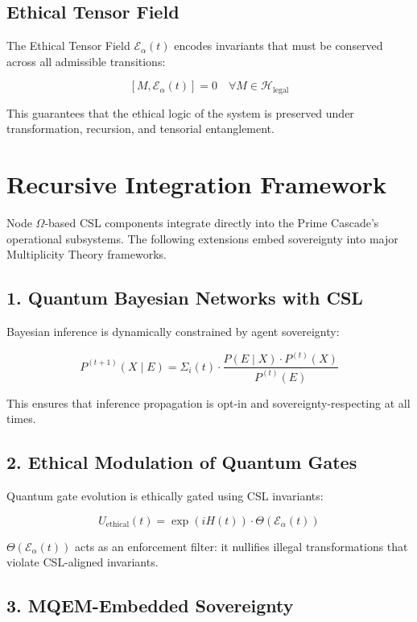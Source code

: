 \documentclass[12pt]{article}
\begin{document}
\subsection*{Ethical Tensor Field}

The Ethical Tensor Field $\mathcal{E}_\alpha(t)$ encodes invariants that must be conserved across all admissible transitions:

\[
[M, \mathcal{E}_\alpha(t)] = 0 \quad \forall M \in \mathcal{H}_{\text{legal}}
\]

This guarantees that the ethical logic of the system is preserved under transformation, recursion, and tensorial entanglement.

\section{Recursive Integration Framework}

Node $\Omega$-based CSL components integrate directly into the Prime Cascade’s operational subsystems. The following extensions embed sovereignty into major Multiplicity Theory frameworks.

\subsection*{1. Quantum Bayesian Networks with CSL}

Bayesian inference is dynamically constrained by agent sovereignty:

\[
P^{(t+1)}(X \mid E) = \Sigma_i(t) \cdot \frac{P(E \mid X) \cdot P^{(t)}(X)}{P^{(t)}(E)}
\]

This ensures that inference propagation is opt-in and sovereignty-respecting at all times.

\subsection*{2. Ethical Modulation of Quantum Gates}

Quantum gate evolution is ethically gated using CSL invariants:

\[
U_{\text{ethical}}(t) = \exp(iH(t)) \cdot \Theta(\mathcal{E}_\alpha(t))
\]

$\Theta(\mathcal{E}_\alpha(t))$ acts as an enforcement filter: it nullifies illegal transformations that violate CSL-aligned invariants.

\subsection*{3. MQEM-Embedded Sovereignty}
\end{document}
